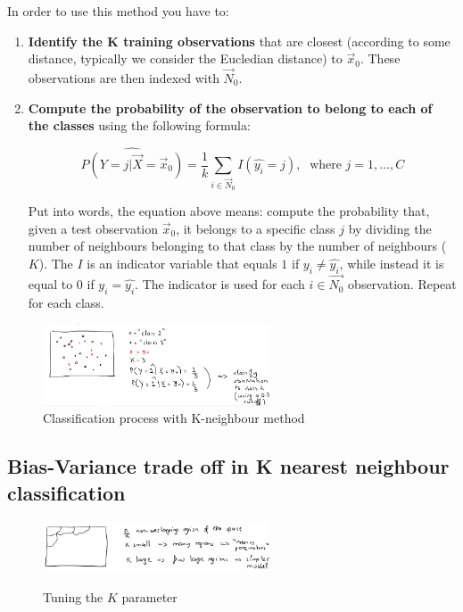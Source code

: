     In order to use this method you have to: 
    \begin{enumerate}
      \item \textbf{Identify the K training observations} that are closest
      (according to some distance, typically we consider the Eucledian distance)
      to $\vec{x}_0$. These observations  are then indexed with $\vec{N}_0$.

      \item \textbf{Compute the probability of the observation to belong to each
      of the classes} using the following formula:

      $$
      \hat{P(Y = j | \vec{X} = \vec{x}_0)} = \frac{1}{k}\sum_{i \in \vec{N}_0}{I(\hat{y_i} = j)},\;
      \text{ where } j = 1, \dots, C
      $$     

      Put into words, the equation above means: compute the probability that,
      given a test observation $\vec{x}_0$, it belongs to a specific class $j$
      by dividing the number of neighbours belonging to that class by the number
      of neighbours ($K$). The $I$ is an indicator variable that equals $1$ if
      $y_i \neq \hat{y_i}$, while instead it is equal to $0$ if $y_i =
      \hat{y_i}$. The indicator is used for each $i \in \vec{N_0}$ observation.
      Repeat for each class.
    \end{enumerate} 

\begin{figure}[H]
\caption{Classification process with K-neighbour method}
\centering
\includegraphics[width=0.6\textwidth]{Kneighbour}
\end{figure}



    \subsection{Bias-Variance trade off in K nearest neighbour classification}

    \begin{figure}[H]
      \caption{Tuning the $ K $ parameter}
      \centering
      \includegraphics[width=0.6\textwidth]{KneigComplexityLogic}
      \label{KneigCompLog}
      \end{figure}

